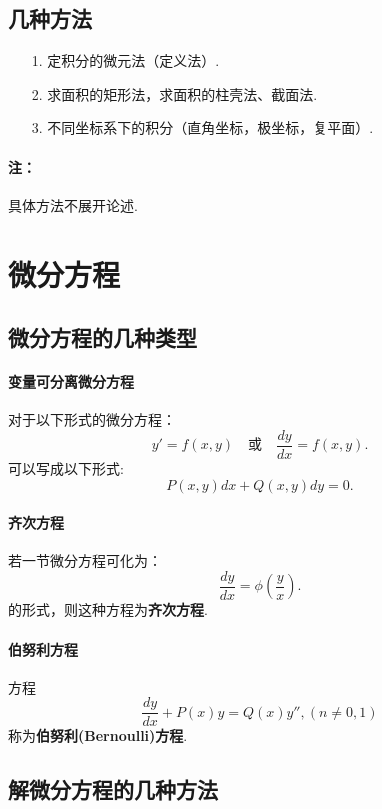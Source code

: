 \documentclass[12pt, a4paper, oneside]{ctexart}
\begin{document}
\subsection{几种方法}
\begin{enumerate}
	\item [1.]定积分的微元法（定义法）.
	\item [2.]求面积的矩形法，求面积的柱壳法、截面法.
	\item [3.]不同坐标系下的积分（直角坐标，极坐标，复平面）.
\end{enumerate}
\paragraph{注：}具体方法不展开论述.


\newpage
\section{微分方程}
\subsection{微分方程的几种类型}
\paragraph{变量可分离微分方程}对于以下形式的微分方程：
\begin{equation}
	y'=f(x,y) \quad \text {或} \quad \frac{dy}{dx}=f(x,y).
\end{equation}
可以写成以下形式:
\begin{equation}
	P(x,y)dx+Q(x,y)dy=0.
\end{equation}
\vskip 1cm
\paragraph{齐次方程}若一节微分方程可化为：
\begin{equation}
	\frac{dy}{dx}=\phi(\frac{y}{x}).
\end{equation}
的形式，则这种方程为\textbf{齐次方程}.
\vskip 1cm
\paragraph{伯努利方程}方程
\begin{equation}
	\frac{dy}{dx}+P(x)y=Q(x)y'',(n\neq 0,1)
\end{equation}
称为\textbf{伯努利(Bernoulli)方程}.

\subsection{解微分方程的几种方法}
\end{document}
